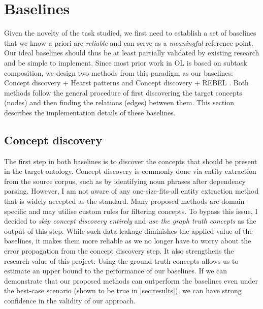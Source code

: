 \section{Baselines}  \label{sec:implementation:baselines}

Given the novelty of the task studied, we first need to establish a set of baselines that we know a priori are \emph{reliable} and can serve as a \emph{meaningful} reference point. Our ideal baselines should thus be at least partially validated by existing research and be simple to implement. Since most prior work in OL is based on subtask composition, we design two methods from this paradigm as our baselines: Concept discovery + Hearst patterns \cite{hearst1998automated} and Concept discovery + REBEL \cite{cabot2021rebel}. Both methods follow the general procedure of first discovering the target concepts (nodes) and then finding the relations (edges) between them. This section describes the implementation details of these baselines.

\subsection{Concept discovery}

The first step in both baselines is to discover the concepts that should be present in the target ontology. Concept discovery is commonly done via entity extraction from the source corpus, such as by identifying noun phrases after dependency parsing. However, I am not aware of any one-size-fits-all entity extraction method that is widely accepted as the standard. Many proposed methods are domain-specific and may utilise custom rules for filtering concepts.  To bypass this issue, I decided to \emph{skip concept discovery entirely} and \emph{use the graph truth concepts} as the output of this step. While such data leakage diminishes the applied value of the baselines, it makes them more reliable as we no longer have to worry about the error propagation from the concept discovery step. It also strengthens the research value of this project: Using the ground truth concepts allows us to estimate an upper bound to the performance of our baselines. If we can demonstrate that our proposed methods can outperform the baselines even under the best-case scenario (shown to be true in \cref{sec:results}), we can have strong confidence in the validity of our approach.

